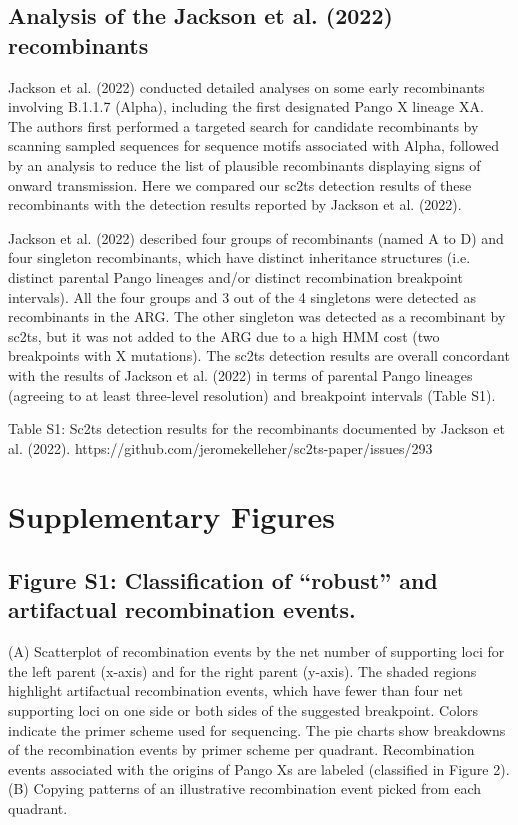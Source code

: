\documentclass[12pt,letterpaper]{article}
\begin{document}
\subsection*{Analysis of the Jackson et al. (2022) recombinants}
Jackson et al. (2022) conducted detailed analyses on some early recombinants involving B.1.1.7 (Alpha), 
including the first designated Pango X lineage XA. 
The authors first performed a targeted search for candidate recombinants 
by scanning sampled sequences for sequence motifs associated with Alpha, 
followed by an analysis to reduce the list of plausible recombinants displaying signs of onward transmission. 
Here we compared our sc2ts detection results of these recombinants with the detection results reported by Jackson et al. (2022).

Jackson et al. (2022) described four groups of recombinants (named A to D) and four singleton recombinants, 
which have distinct inheritance structures (i.e. distinct parental Pango lineages and/or distinct recombination breakpoint intervals). 
All the four groups and 3 out of the 4 singletons were detected as recombinants in the ARG. 
The other singleton was detected as a recombinant by sc2ts, 
but it was not added to the ARG due to a high HMM cost (two breakpoints with X mutations). 
The sc2ts detection results are overall concordant with the results of Jackson et al. (2022) in terms of 
parental Pango lineages (agreeing to at least three-level resolution) and breakpoint intervals (Table S1).

Table S1: Sc2ts detection results for the recombinants documented by Jackson et al. (2022).
https://github.com/jeromekelleher/sc2ts-paper/issues/293


\section*{Supplementary Figures}

\subsection*{Figure S1: Classification of “robust” and artifactual recombination events.}
(A) Scatterplot of recombination events by the net number of supporting loci for the left parent (x-axis) and for the right parent (y-axis). 
The shaded regions highlight artifactual recombination events, 
which have fewer than four net supporting loci on one side or both sides of the suggested breakpoint. 
Colors indicate the primer scheme used for sequencing. 
The pie charts show breakdowns of the recombination events by primer scheme per quadrant. 
Recombination events associated with the origins of Pango Xs are labeled (classified in Figure 2). 
(B) Copying patterns of an illustrative recombination event picked from each quadrant.
\end{document}
